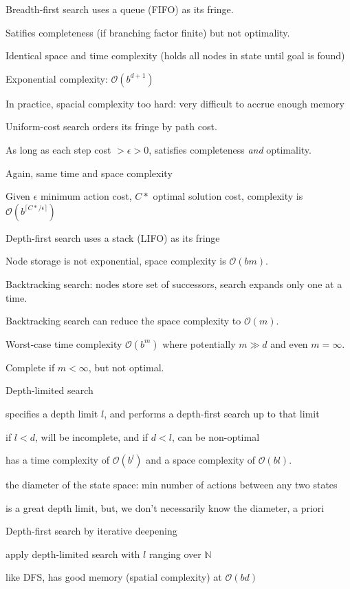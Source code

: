 \documentclass[12pt]{article}
\begin{document}
\noindent
Breadth-first search uses a queue (FIFO) as its fringe.

Satifies completeness (if branching factor finite) but not optimality.

Identical space and time complexity (holds all nodes in state until goal is found)

Exponential complexity: $\mathcal{O}(b^{d + 1})$

In practice, spacial complexity too hard: very difficult to accrue enough memory

\noindent
Uniform-cost search orders its fringe by path cost.

As long as each step cost $> \epsilon> 0$, satisfies completeness \textit{and} optimality.

Again, same time and space complexity

Given $\epsilon$ minimum action cost, $C*$ optimal solution cost, complexity is $\mathcal{O}(b^{\lceil C*/\epsilon \rceil})$

\noindent
Depth-first search uses a stack (LIFO) as its fringe

Node storage is not exponential, space complexity is $\mathcal{O}(bm)$.

Backtracking search: nodes store set of successors, search expands only one at a time.

Backtracking search can reduce the space complexity to $\mathcal{O}(m)$.

Worst-case time complexity $\mathcal{O}(b^m)$ where potentially $m \gg d$ and even $m = \infty$.

Complete if $m < \infty$, but not optimal.

\noindent
Depth-limited search

specifies a depth limit $l$, and performs a depth-first search up to that limit

if $l < d$, will be incomplete, and if $d < l$, can be non-optimal

has a time complexity of $\mathcal{O}(b^l)$ and a space complexity of $\mathcal{O}(bl)$.

the diameter of the state space: min number of actions between any two states

is a great depth limit, but, we don't necessarily know the diameter, a priori

\noindent
Depth-first search by iterative deepening

apply depth-limited search with $l$ ranging over $\mathds{N}$

like DFS, has good memory (spatial complexity) at $\mathcal{O}(bd)$
\end{document}
